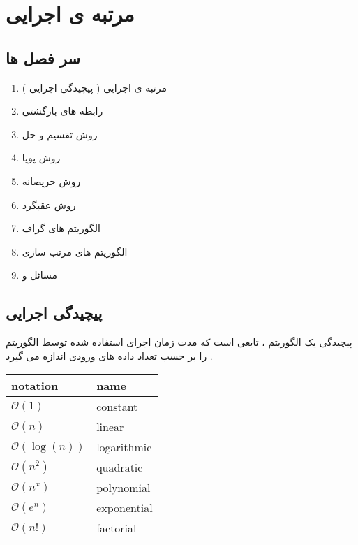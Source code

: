 \documentclass[12pt]{book}
\begin{document}
\chapter{مرتبه ی اجرایی
}



\section{سر فصل ها}



\begin{enumerate}
	\item مرتبه ی اجرایی ( پیچیدگی اجرایی )
	\item رابطه های بازگشتی
	\item روش تقسیم و حل
	\item روش پویا
	\item روش حریصانه
	\item روش عقبگرد 
	\item الگوریتم های گراف
	\item الگوریتم های مرتب سازی
	\item مسائل
	و
\end{enumerate}



\section{پیچیدگی اجرایی}


پیچیدگی یک الگوریتم ، تابعی است که مدت زمان اجرای استفاده شده توسط الگوریتم را بر حسب تعداد داده های ورودی 
اندازه می گیرد .




\begin{latin}
\begin{center}
  \bgroup
  \def\arraystretch{1.5}%
  \begin{tabular}{ l | l  }
    notation
    &
    name
     \\ \hline
     $\mathcal{O}(1)$
     &
     constant
     \\ \hline
     $\mathcal{O}(n)$
     &
     linear
     \\ \hline
     $\mathcal{O}(\log{(n)})$
     &
     logarithmic
     \\ \hline
     $\mathcal{O}(n^2)$
     &
     quadratic
     \\ \hline
     $\mathcal{O}(n^x)$
     &
     polynomial
     \\ \hline
     $\mathcal{O}(e^n)$
     &
     exponential
     \\ \hline
     $\mathcal{O}(n!)$
     &
     factorial
     \\
  \end{tabular}
  \egroup
\end{center}
\end{latin}
\end{document}
